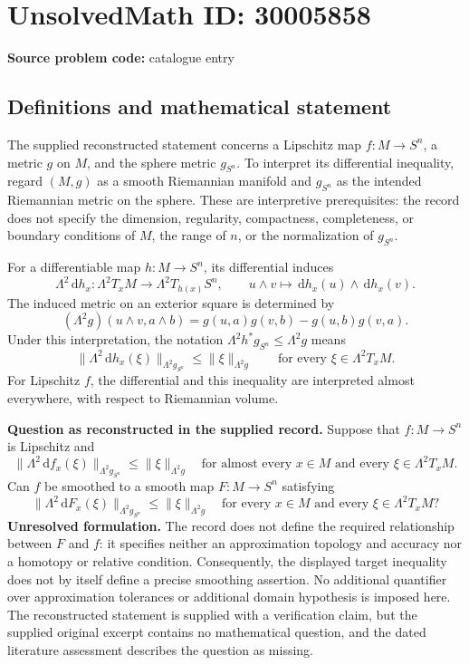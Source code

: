 \documentclass[11pt]{article}
\newcommand{\dd}{\,\mathrm{d}}
\begin{document}
\section*{UnsolvedMath ID: 30005858}
\textbf{Source problem code:} catalogue entry
\subsection{Definitions and mathematical statement}
The supplied reconstructed statement concerns a Lipschitz map \(f\colon M\to S^n\), a metric \(g\) on \(M\), and the sphere metric \(g_{S^n}\). To interpret its differential inequality, regard \((M,g)\) as a smooth Riemannian manifold and \(g_{S^n}\) as the intended Riemannian metric on the sphere. These are interpretive prerequisites: the record does not specify the dimension, regularity, compactness, completeness, or boundary conditions of \(M\), the range of \(n\), or the normalization of \(g_{S^n}\).

For a differentiable map \(h\colon M\to S^n\), its differential induces
\[
\Lambda^2\dd h_x\colon \Lambda^2T_xM\longrightarrow\Lambda^2T_{h(x)}S^n,
\qquad
u\wedge v\longmapsto\dd h_x(u)\wedge\dd h_x(v).
\]
The induced metric on an exterior square is determined by
\[
(\Lambda^2g)(u\wedge v,a\wedge b)
=g(u,a)g(v,b)-g(u,b)g(v,a).
\]
Under this interpretation, the notation \(\Lambda^2h^*g_{S^n}\leq\Lambda^2g\) means
\[
\bigl\|\Lambda^2\dd h_x(\xi)\bigr\|_{\Lambda^2g_{S^n}}
\leq \|\xi\|_{\Lambda^2g}
\qquad\text{for every }\xi\in\Lambda^2T_xM.
\]
For Lipschitz \(f\), the differential and this inequality are interpreted almost everywhere, with respect to Riemannian volume.

\textbf{Question as reconstructed in the supplied record.} Suppose that \(f\colon M\to S^n\) is Lipschitz and
\[
\bigl\|\Lambda^2\dd f_x(\xi)\bigr\|_{\Lambda^2g_{S^n}}
\leq\|\xi\|_{\Lambda^2g}
\quad\text{for almost every }x\in M
\text{ and every }\xi\in\Lambda^2T_xM.
\]
Can \(f\) be smoothed to a smooth map \(F\colon M\to S^n\) satisfying
\[
\bigl\|\Lambda^2\dd F_x(\xi)\bigr\|_{\Lambda^2g_{S^n}}
\leq\|\xi\|_{\Lambda^2g}
\quad\text{for every }x\in M
\text{ and every }\xi\in\Lambda^2T_xM?
\]
\textbf{Unresolved formulation.} The record does not define the required relationship between \(F\) and \(f\): it specifies neither an approximation topology and accuracy nor a homotopy or relative condition. Consequently, the displayed target inequality does not by itself define a precise smoothing assertion. No additional quantifier over approximation tolerances or additional domain hypothesis is imposed here. The reconstructed statement is supplied with a verification claim, but the supplied original excerpt contains no mathematical question, and the dated literature assessment describes the question as missing.
\end{document}

